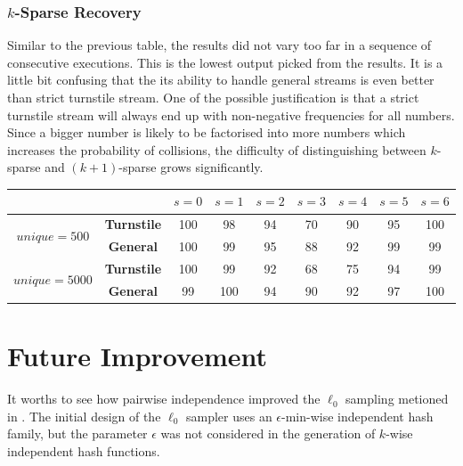 \documentclass[a4paper, 11pt]{article}
\begin{document}
            \subsubsection{$k$-Sparse Recovery}
                Similar to the previous table, the results did not vary too far in a sequence of consecutive executions. This is the lowest output picked from the results. It is a little bit confusing that the its ability to handle general streams is even better than strict turnstile stream. One of the possible justification is that a strict turnstile stream will always end up with non-negative frequencies for all numbers. Since a bigger number is likely to be factorised into more numbers which increases the probability of collisions, the difficulty of distinguishing between $k$-sparse and $(k+1)$-sparse grows significantly.
                \begin{table}[h]
                    \centering
                    \begin{tabular}{|c|c|c|c|c|c|c|c|c|}
                    \hline
                                                     &                    & $s = 0$ & $s = 1$ & $s = 2$ & $s = 3$ & $s = 4$ & $s = 5$ & $s = 6$ \\ \hline
                    \multirow{2}{*}{$unique = 500$}  & \textbf{Turnstile} & 100     & 98      & 94      & 70      & 90      & 95      & 100     \\ \cline{2-9}
                                                     & \textbf{General}   & 100     & 99      & 95      & 88      & 92      & 99      & 99      \\ \hline
                    \multirow{2}{*}{$unique = 5000$} & \textbf{Turnstile} & 100     & 99      & 92      & 68      & 75      & 94      & 99      \\ \cline{2-9}
                                                     & \textbf{General}   & 99      & 100     & 94      & 90      & 92      & 97      & 100     \\ \hline
                    \end{tabular}
                \end{table}
    \section{Future Improvement}
        It worths to see how pairwise independence improved the $\ell_{0}$ sampling metioned in \cite{Cormode:2014:UFA:2631033.2631080}. The initial design of the $\ell_{0}$ sampler uses an $\epsilon$-min-wise independent hash family, but the parameter $\epsilon$ was not considered in the generation of $k$-wise independent hash functions.
    
    
\end{document}
